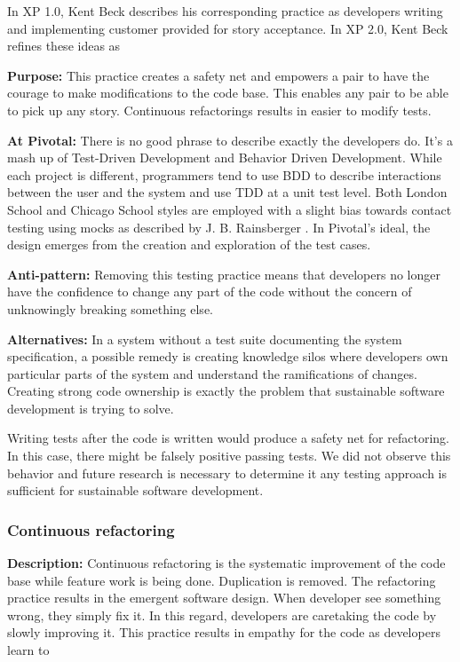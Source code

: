 \begin{table}[]
In XP 1.0, Kent Beck describes his corresponding  practice as developers writing  and implementing customer provided  for story acceptance. In XP 2.0, Kent Beck refines these ideas as  

\textbf{Purpose:} This practice creates a safety net and empowers a pair to have the courage to make modifications to the code base. This enables any pair to be able to pick up any story. Continuous refactorings results in easier to modify tests.

\textbf{At Pivotal:} There is no good phrase to describe exactly the developers do. It's a mash up of Test-Driven Development and Behavior Driven Development. While each project is different, programmers tend to use BDD to describe interactions between the user and the system and use TDD at a unit test level. Both London School and Chicago School styles are employed with a slight bias towards contact testing using mocks as described by J. B. Rainsberger \cite{RainsbergerIntegrationTestsYouTube}. In Pivotal's ideal, the design emerges from the creation and exploration of the test cases.  

\textbf{Anti-pattern:} Removing this testing practice means that developers no longer have the confidence to change any part of the code without the concern of unknowingly breaking something else. 

\textbf{Alternatives:} In a system without a test suite documenting the system specification, a possible remedy is creating knowledge silos where developers own particular parts of the system and understand the ramifications of changes. Creating strong code ownership is exactly the problem that sustainable software development is trying to solve.

Writing tests after the code is written would produce a safety net for refactoring. In this case, there might be falsely positive passing tests. We did not observe this behavior and future research is necessary to determine it any testing approach is sufficient for sustainable software development.

\subsubsection{Continuous refactoring}
\textbf{Description:} Continuous refactoring is the systematic improvement of the code base while feature work is being done. Duplication is removed. The refactoring practice results in the emergent software design. When developer see something wrong, they simply fix it. In this regard, developers are caretaking the code by slowly improving it. This practice results in empathy for the code as developers learn to 


\end{table}
